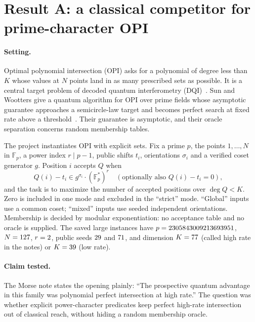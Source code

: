 \documentclass[10pt]{article}
\newcommand{\Fp}{\mathbb{F}_p}
\begin{document}
\section{Result A: a classical competitor for prime-character OPI}
\label{sec:opi}

\paragraph{Setting.} Optimal polynomial intersection (OPI) asks for a polynomial of degree less than $K$ whose values at $N$ points land in as many prescribed sets as possible. It is a central target problem of decoded quantum interferometry (DQI)~\cite{JordanDQI2024}. Sun and Wootters give a quantum algorithm for OPI over prime fields whose asymptotic guarantee approaches a semicircle-law target and becomes perfect search at fixed rate above a threshold~\cite{SunWootters2026}. Their guarantee is asymptotic, and their oracle separation concerns random membership tables.

The project instantiates OPI with explicit sets. Fix a prime $p$, the points $1,\ldots,N$ in $\Fp$, a power index $r \mid p-1$, public shifts $t_i$, orientations $\sigma_i$ and a verified coset generator $g$. Position $i$ accepts $Q$ when
\[
Q(i) - t_i \in g^{\sigma_i} \cdot (\Fp^{\ast})^{r} \quad (\text{optionally also } Q(i)-t_i=0),
\]
and the task is to maximize the number of accepted positions over $\deg Q < K$. Zero is included in one mode and excluded in the ``strict'' mode. ``Global'' inputs use a common coset; ``mixed'' inputs use seeded independent orientations. Membership is decided by modular exponentiation: no acceptance table and no oracle is supplied. The saved large instances have $p=2305843009213693951$, $N=127$, $r=2$, public seeds $29$ and $71$, and dimension $K=77$ (called high rate in the notes) or $K=39$ (low rate).

\paragraph{Claim tested.} The Morse note states the opening plainly: ``The prospective quantum advantage in this family was polynomial perfect intersection at high rate.'' The question was whether explicit power-character predicates keep perfect high-rate intersection out of classical reach, without hiding a random membership oracle.
\end{document}
